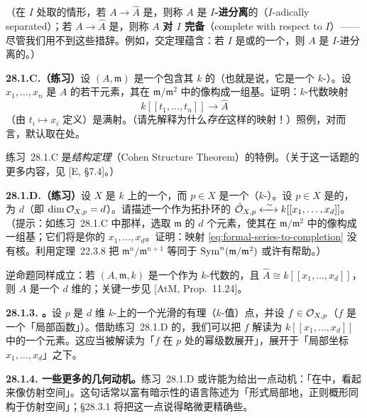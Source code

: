 （在\trIdeal{} $I$ 处取\trCompletion{}的情形，若 $A\to\hat{A}$ 是\trInjectiveMap，则称 $A$ 是 \textbf{$I$-进分离}的（$I$-adically separated）；若 $A\to\hat{A}$ 是\trIsomorphism，则称 $A$ \textbf{对 $I$ 完备}（complete with respect to $I$）——尽管我们用不到这些措辞。例如，\trKrull{}交定理蕴含：若 $I$ 是\trNoether{}\trIntegralDomain{}或\trNoether{}\trLocalRing{}的一个\trProperIdeal，则 $A$ 是 $I$-进分离的。）

\textbf{28.1.C.（练习）}\quad 设 $(A,\mathfrak{m})$ 是一个包含其\trResidueField{} $k$ 的\trNoether{}\trLocalRing（也就是说，它是一个 $k$-\trAlgebra）。设 $x_1,\dots,x_n$ 是 $A$ 的若干元素，其在 $\mathfrak{m}/\mathfrak{m}^2$ 中的像构成一组基。证明：$k$-代数映射
\begin{equation*}
\tag{28.1.2.1}\label{eq:formal-series-to-completion}
k[[t_1,\dots,t_n]]\longrightarrow\hat{A}
\end{equation*}
（由 $t_i\mapsto x_i$ 定义）是满射。（请先解释为什么\emph{存在}这样的映射！）照例，对\trLocalRing{}而言，\trCompletion{}默认取在\trMaximalIdeal{}处。

\mbox{练习~28.1.C} 是\emph{\trCohen{}结构定理}（Cohen Structure Theorem）的特例。（关于这一话题的更多内容，见 [E, \S7.4]。）

\textbf{28.1.D.（练习）}\quad 设 $X$ 是 $k$ 上的一个\trLocally\trNoether{}\trScheme，而 $p\in X$ 是一个\trRationalPoint{}（$k$-\trValuedPoint）。设 $p\in X$ 是\trRegular{}的，\trCodimension{}为 $d$（即 $\dim\mathcal{O}_{X,p}=d$）。请描述一个作为拓扑环的\trIsomorphism{} $\hat{\OO}_{X,p}\xleftrightarrow{\ \sim\ }k[[x_1,\dots,x_d]]$。（提示：如\mbox{练习~28.1.C} 中那样，选取 $\mathfrak{m}$ 的 $d$ 个元素，使其在 $\mathfrak{m}/\mathfrak{m}^2$ 中的像构成一组基；它们将是你的 $x_1,\dots,x_d$。证明：映射 \eqref{eq:formal-series-to-completion} 没有核。利用\mbox{定理~22.3.8} 把 $\mathfrak{m}^n/\mathfrak{m}^{n+1}$ 等同于 $\operatorname{Sym}^n(\mathfrak{m}/\mathfrak{m}^2)$ 或许有帮助。）

逆命题同样成立：若 $(A,\mathfrak{m},k)$ 是一个作为 $k$-代数的\trNoether{}\trLocalRing，且 $\hat{A}\cong k[[x_1,\dots,x_d]]$，则 $A$ 是一个 $d$ 维的\trRegular\trLocalRing；关键一步见 [AtM, Prop.~11.24]。

\textbf{28.1.3. \trhRemark。}\quad 设 $p$ 是 $d$ 维 $k$-\trVariety{}上的一个光滑的有理（$k$-值）点，并设 $f\in\mathcal{O}_{X,p}$（$f$ 是一个「局部函数」）。借助\mbox{练习~28.1.D} 的\trIsomorphism，我们可以把 $f$ 解读为 $k[[x_1,\dots,x_d]]$ 中的一个元素。这应当被解读为「$f$ 在 $p$ 处的幂级数展开」，展开于「局部坐标 $x_1,\dots,x_d$」之下。

\textbf{28.1.4. 一些更多的几何动机。}\quad \mbox{练习~28.1.D} 或许能为\trCompletion{}给出一点动机：「在\trCompletion{}中，\trRegular\trScheme{}看起来像仿射空间」。这句话常以富有暗示性的语言陈述为「形式局部地，正则概形同构于仿射空间」；\S28.3.1 将把这一点说得略微更精确些。

